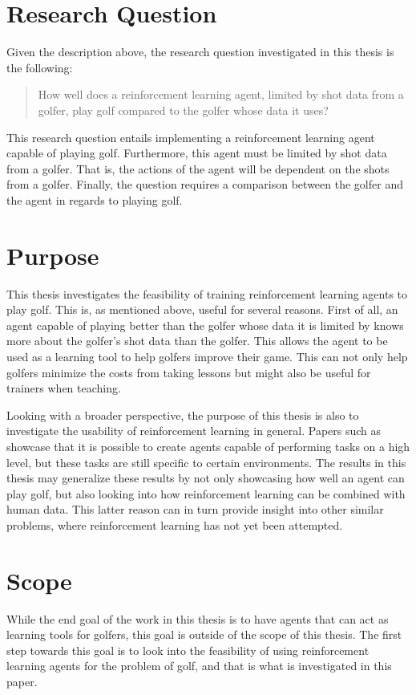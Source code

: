 \documentclass{kththesis}
\begin{document}
\section{Research Question}
Given the description above, the research question investigated in this thesis is the following:
\begin{quote}
    How well does a reinforcement learning agent, limited by shot data from a golfer, play golf compared to the golfer whose data it uses?
\end{quote}
This research question entails implementing a reinforcement learning agent capable of playing golf. Furthermore, this agent must be limited by shot data from a golfer. That is, the actions of the agent will be dependent on the shots from a golfer. Finally, the question requires a comparison between the golfer and the agent in regards to playing golf. 

\section{Purpose}
This thesis investigates the feasibility of training reinforcement learning agents to play golf. This is, as mentioned above, useful for several reasons. First of all, an agent capable of playing better than the golfer whose data it is limited by knows more about the golfer's shot data than the golfer. This allows the agent to be used as a learning tool to help golfers improve their game. This can not only help golfers minimize the costs from taking lessons but might also be useful for trainers when teaching.

Looking with a broader perspective, the purpose of this thesis is also to investigate the usability of reinforcement learning in general. Papers such as \textcite{mnih2015human} showcase that it is possible to create agents capable of performing tasks on a high level, but these tasks are still specific to certain environments. The results in this thesis may generalize these results by not only showcasing how well an agent can play golf, but also looking into how reinforcement learning can be combined with human data. This latter reason can in turn provide insight into other similar problems, where reinforcement learning has not yet been attempted. 

\section{Scope}
While the end goal of the work in this thesis is to have agents that can act as learning tools for golfers, this goal is outside of the scope of this thesis. The first step towards this goal is to look into the feasibility of using reinforcement learning agents for the problem of golf, and that is what is investigated in this paper.
\end{document}
